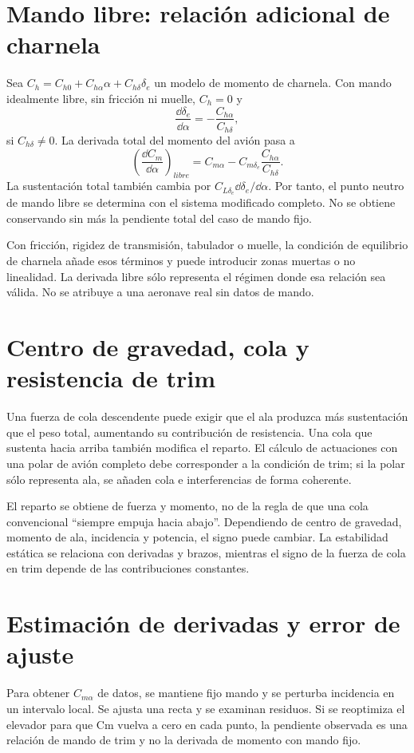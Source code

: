 \section{Mando libre: relación adicional de charnela}
Sea $C_h=C_{h0}+C_{h\alpha}\alpha+C_{h\delta}\delta_e$ un modelo de momento de charnela. Con mando idealmente libre, sin fricción ni muelle, $C_h=0$ y
\begin{equation}
\frac{\dd\delta_e}{\dd\alpha}=-\frac{C_{h\alpha}}{C_{h\delta}},
\end{equation}
si $C_{h\delta}\neq0$. La derivada total del momento del avión pasa a
\begin{equation}
\left(\frac{\dd C_m}{\dd\alpha}\right)_{libre}
=C_{m\alpha}-C_{m\delta_e}\frac{C_{h\alpha}}{C_{h\delta}}.
\end{equation}
La sustentación total también cambia por $C_{L\delta_e}\dd\delta_e/\dd\alpha$. Por tanto, el punto neutro de mando libre se determina con el sistema modificado completo. No se obtiene conservando sin más la pendiente total del caso de mando fijo.

Con fricción, rigidez de transmisión, tabulador o muelle, la condición de equilibrio de charnela añade esos términos y puede introducir zonas muertas o no linealidad. La derivada libre sólo representa el régimen donde esa relación sea válida. No se atribuye a una aeronave real sin datos de mando.

\section{Centro de gravedad, cola y resistencia de trim}
Una fuerza de cola descendente puede exigir que el ala produzca más sustentación que el peso total, aumentando su contribución de resistencia. Una cola que sustenta hacia arriba también modifica el reparto. El cálculo de actuaciones con una polar de avión completo debe corresponder a la condición de trim; si la polar sólo representa ala, se añaden cola e interferencias de forma coherente.

El reparto se obtiene de fuerza y momento, no de la regla de que una cola convencional ``siempre empuja hacia abajo''. Dependiendo de centro de gravedad, momento de ala, incidencia y potencia, el signo puede cambiar. La estabilidad estática se relaciona con derivadas y brazos, mientras el signo de la fuerza de cola en trim depende de las contribuciones constantes.

\section{Estimación de derivadas y error de ajuste}
Para obtener $C_{m\alpha}$ de datos, se mantiene fijo mando y se perturba incidencia en un intervalo local. Se ajusta una recta y se examinan residuos. Si se reoptimiza el elevador para que Cm vuelva a cero en cada punto, la pendiente observada es una relación de mando de trim y no la derivada de momento con mando fijo.

